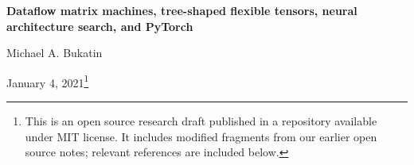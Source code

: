 \documentclass{article}
\begin{document}
\renewcommand{\abstractname}{\vspace{-\baselineskip}}

\renewcommand\contentsname{\vspace{-\baselineskip}}


\begin{center}

{\bf Dataflow matrix machines, tree-shaped flexible tensors, neural architecture search, and PyTorch}
                                   



\vspace{0.1in}
Michael A. Bukatin


\vspace{0.085in}
January 4, 2021\footnote{This is an open source research draft published in a repository available under MIT license.
It includes modified fragments from our earlier open source notes; relevant references are included below.}
\end{center}
\end{document}
